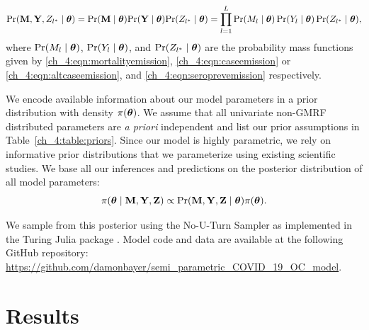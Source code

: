 \begin{equation*}
\text{Pr}(\mathbf{M}, \mathbf{Y},  Z_{l^*} \mid \boldsymbol{\theta} ) = \text{Pr}(\mathbf{M} \mid \boldsymbol{\theta} ) \text{Pr}(\mathbf{Y} \mid \boldsymbol{\theta} ) \text{Pr}(Z_{l^*} \mid \boldsymbol{\theta} ) =   \prod_{l=1}^{L}\Pr(M_l\mid\boldsymbol{\theta}) \Pr(Y_l\mid\boldsymbol{\theta}) \Pr(Z_{l^*}\mid\boldsymbol{\theta}),
\end{equation*}
where $\text{Pr}(M_l \mid \boldsymbol{\theta})$, $\text{Pr}(Y_l \mid \boldsymbol{\theta})$, and $\text{Pr}(Z_{l^*} \mid \boldsymbol{\theta})$ are the probability mass functions given by \eqref{ch_4:eqn:mortalityemission}, \eqref{ch_4:eqn:caseemission} or \eqref{ch_4:eqn:altcaseemission}, and \eqref{ch_4:eqn:seroprevemission} respectively.
\par
We encode available information about our model parameters in a prior distribution with density $\pi(\boldsymbol{\theta})$.
We assume that all univariate non-GMRF distributed parameters are \textit{a priori} independent and list our prior assumptions in Table~\ref{ch_4:table:priors}.
Since our model is highly parametric, we rely on informative prior distributions that we parameterize using existing scientific studies.
We base all our inferences and predictions on the posterior distribution of all model parameters:
\begin{equation}
\pi(\boldsymbol{\theta}\mid \mathbf{M},\mathbf{Y}, \mathbf{Z}) \propto \text{Pr}(\mathbf{M}, \mathbf{Y}, \mathbf{Z} \mid \boldsymbol{\theta} ) \pi(\boldsymbol{\theta}).
\end{equation}

We sample from this posterior using the No-U-Turn Sampler \citep{NUTS} as implemented in the Turing Julia package \citep{turing}.
Model code and data are available at the following GitHub repository: \url{https://github.com/damonbayer/semi_parametric_COVID_19_OC_model}.

\section{Results}
\label{ch_4:sec:results}
